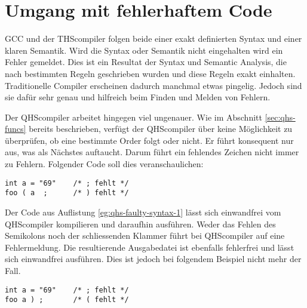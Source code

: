 \section{Umgang mit fehlerhaftem Code}
GCC und der THScompiler folgen beide einer exakt definierten Syntax und einer klaren Semantik.
Wird die Syntax oder Semantik nicht eingehalten wird ein Fehler gemeldet.
Dies ist ein Resultat der Syntax und Semantic Analysis, die nach bestimmten Regeln geschrieben wurden und diese Regeln exakt einhalten.
Traditionelle Compiler erscheinen dadurch manchmal etwas pingelig. Jedoch sind sie dafür sehr genau und hilfreich beim Finden und Melden von Fehlern.

Der QHScompiler arbeitet hingegen viel ungenauer.
Wie im Abschnitt \ref{sec:qhs-funcs} bereits beschrieben, verfügt der QHScompiler über keine Möglichkeit zu überprüfen, ob eine bestimmte Order folgt oder nicht.
Er führt konsequent nur aus, was als Nächstes auftaucht. Darum führt ein fehlendes Zeichen nicht immer zu Fehlern.
Folgender Code soll dies veranschaulichen:

\begin{lstlisting}[language=QHS, caption=QHS mit fehlenden Tokens, label=eg:qhs-faulty-syntax-1]
int a = "69"    /* ; fehlt */
foo ( a  ;      /* ) fehlt */
\end{lstlisting}

Der Code aus Auflistung \ref{eg:qhs-faulty-syntax-1} lässt sich einwandfrei vom QHScompiler kompilieren und daraufhin ausführen.
Weder das Fehlen des Semikolons noch der schliessenden Klammer führt bei QHScompiler auf eine Fehlermeldung.
Die resultierende Ausgabedatei ist ebenfalls fehlerfrei und lässt sich einwandfrei ausführen. 
Dies ist jedoch bei folgendem Beispiel nicht mehr der Fall.

\begin{lstlisting}[language=QHS, caption=QHS mit fehlender öffnender Klammer, label=eg:qhs-faulty-syntax-2]
int a = "69"    /* ; fehlt */
foo a ) ;       /* ( fehlt */
\end{lstlisting}

